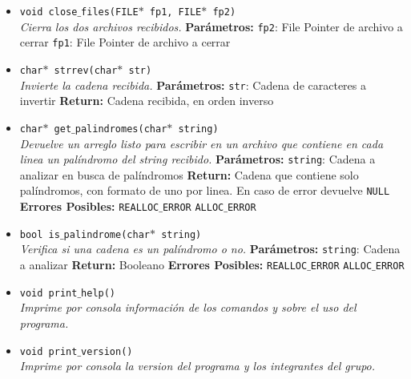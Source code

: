 \documentclass[a4paper, 10pt]{article}
\def\code#1{\texttt{#1}}
\begin{document}
\begin{itemize}
				\item \code{void close$\_$files(FILE$*$ fp1, FILE$*$ fp2)}
				\\\textit{Cierra los dos archivos recibidos.}
					\subitem \textbf{Parámetros:}
						\subsubitem \code{fp2}: File Pointer de archivo a cerrar
						\subsubitem \code{fp1}: File Pointer de archivo a cerrar

				\item \code{char$*$ strrev(char$*$ str)}
				\\\textit{Invierte la cadena recibida.}
					\subitem \textbf{Parámetros:}
						\subsubitem \code{str}: Cadena de caracteres a invertir
					\subitem \textbf{Return:}
						\subsubitem Cadena recibida, en orden inverso

				\item \code{char$*$ get$\_$palindromes(char$*$ string)}
				\\\textit{Devuelve un arreglo listo para escribir en un archivo
				que contiene en cada linea un palíndromo del string recibido.}
					\subitem \textbf{Parámetros:}
						\subsubitem \code{string}: Cadena a analizar en busca de palíndromos
					\subitem \textbf{Return:}
						\subsubitem Cadena que contiene solo palíndromos, con
						formato de uno por linea. En caso de error devuelve \code{NULL}
					\subitem \textbf{Errores Posibles:}
						\subsubitem \code{REALLOC$\_$ERROR}
						\subsubitem \code{ALLOC$\_$ERROR}

				\item \code{bool is$\_$palindrome(char$*$ string)}
				\\\textit{Verifica si una cadena es un palíndromo o no.}
					\subitem \textbf{Parámetros:}
						\subsubitem \code{string}: Cadena a analizar
					\subitem \textbf{Return:}
						\subsubitem Booleano
					\subitem \textbf{Errores Posibles:}
						\subsubitem \code{REALLOC$\_$ERROR}
						\subsubitem \code{ALLOC$\_$ERROR}

				\item \code{void print$\_$help()}
				\\\textit{Imprime por consola información de los comandos y sobre el
				uso del programa.}

				\item \code{void print$\_$version()}
				\\\textit{Imprime por consola la version del programa y los integrantes del grupo.}


\end{itemize}
\end{document}
